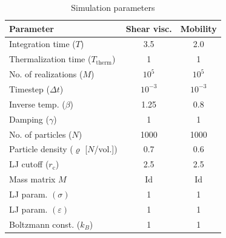 %
\begin{table}[h!]
\begin{center}
	\begin{tabular}{lcc} 
	\toprule
	\bf{Parameter} & {\bf Shear visc.} & {\bf Mobility} \\
	\midrule
    Integration time ($T$) & 3.5 & 2.0 \\
    Thermalization time ($T_\mathrm{therm}$) & 1 & 1 \\
	No. of realizations ($M$) & $10^5$ & $10^5$ \\
	Timestep ($\Delta t$) & $10^{-3}$ & $10^{-3}$ \\
	Inverse temp. ($\beta$) & 1.25 & 0.8 \\
	Damping ($\gamma$) & 1 & 1 \\
	No. of particles ($N$) & 1000 & 1000 \\
	Particle density ($\varrho$ [$N$/vol.]) & 0.7 & 0.6 \\
	LJ cutoff ($r_\mathrm{c}$) & 2.5 & 2.5 \\
	Mass matrix $M$ & {\rm Id} & {\rm Id} \\
	LJ param. $(\sigma)$ & 1 & 1 \\
	LJ param. $(\varepsilon)$ & 1 & 1 \\
	Boltzmann const. ($k_B$) & 1 & 1 \\
	\bottomrule
	\end{tabular}
\end{center}
\caption{Simulation parameters}
\label{table:sim_params}
\end{table}

